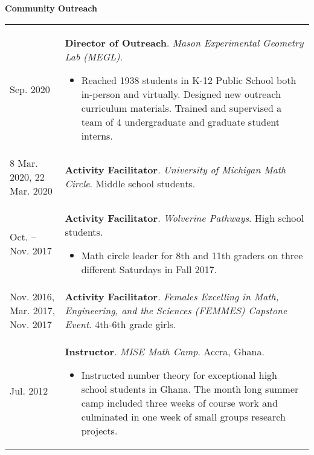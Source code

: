     \vspace{-1em}
    

    \textbf{\large Community Outreach}
    
    \begin{center}
    {
    \renewcommand{\arraystretch}{1.2}
    \begin{longtable}{p{}  p{}}
     Sep.  2020 & \textbf{Director of Outreach}. \textit{Mason Experimental Geometry Lab (MEGL)}. 
        \hspace{-1em}

        {\small
        \begin{itemize}
        \setlength{\parindent}{0em}
        \item[] Reached 1938 students in K-12 Public School both in-person and virtually. Designed new outreach curriculum materials. Trained and supervised a team of 4 undergraduate and graduate student interns.
        \end{itemize}
        }
        \vspace{-1em}
         \\ 
8 Mar.  2020, 22 Mar.  2020 & \textbf{Activity Facilitator}. \textit{University of Michigan Math Circle}.  Middle school students.  \\ 
 Oct.  --  Nov.  2017 & \textbf{Activity Facilitator}. \textit{Wolverine Pathways}.  High school students. 
        \hspace{-1em}

        {\small
        \begin{itemize}
        \setlength{\parindent}{0em}
        \item[] Math circle leader for 8th and 11th graders on three different Saturdays in Fall 2017.
        \end{itemize}
        }
        \vspace{-1em}
         \\ 
 Nov.  2016,  Mar.  2017,  Nov.  2017 & \textbf{Activity Facilitator}. \textit{Females Excelling in Math, Engineering, and the Sciences (FEMMES) Capstone Event}.  4th-6th grade girls.  \\ 
 Jul.  2012 & \textbf{Instructor}. \textit{MISE Math Camp}.  Accra, Ghana. 
        \hspace{-1em}

        {\small
        \begin{itemize}
        \setlength{\parindent}{0em}
        \item[] Instructed number theory for exceptional high school students in Ghana. The month long summer camp included three weeks of course work and culminated in one week of small groups research projects.
        \end{itemize}
        }
        \vspace{-1em}
         
    \end{longtable}
    } 
    \end{center}

    \vspace{-1em}
    